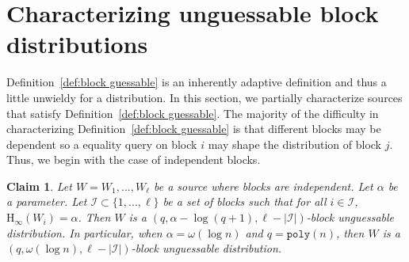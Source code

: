 \documentclass[11pt]{article}
\newcommand{\defref}[1]{\mbox{Definition~\ref{#1}}}
\newcommand{\poly}{\ensuremath{\mathtt{poly}}\xspace}
\newcommand{\Hoo}{\mathrm{H}_\infty}
\newtheorem{claim}[theorem]{Claim}
\begin{document}
\section{Characterizing unguessable block distributions}
\label{sec:characterize}

\defref{def:block guessable} is an inherently adaptive definition and thus a little unwieldy for a distribution.  In this section, we partially characterize sources that satisfy \defref{def:block guessable}.
The majority of the difficulty in characterizing \defref{def:block guessable} is that different blocks may be dependent so a equality query on block $i$ may shape the distribution of block $j$.  Thus, we begin with the case of independent blocks.

\begin{claim}
\label{cl:independent high ent}
Let $W = W_1,..., W_\ell$ be a source where blocks are independent.  Let $\alpha$ be a parameter.  Let $\mathcal{I}\subset \{1,..., \ell\}$ be a set of blocks such that for all $i\in\mathcal{I}$, $\Hoo(W_i ) =\alpha $.  Then $W$ is a $(q, \alpha - \log (q+1), \ell - |\mathcal{I}|)$-block unguessable distribution.  In particular, when $\alpha = \omega(\log n)$ and $q = \poly(n)$, then $W$ is a $(q, \omega(\log n), \ell - |\mathcal{I}|)$-block unguessable distribution.
\end{claim}
\end{document}
